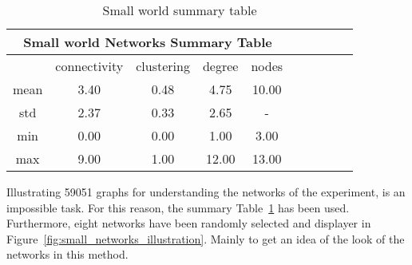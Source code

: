 \begin{table}[!hbtp]
	\centering
	\begin{adjustbox}{width=0.5\textwidth}
		\small
		\begin{tabular}{cccccccccc}
				\toprule
			\multicolumn{5}{|c|}{Small world Networks Summary Table}           \\ \hline
			     & connectivity & clustering & degree & nodes                  \\ \hline
			mean & 3.40         & 0.48       & 4.75   & 10.00                  \\ \hline
			std  & 2.37         & 0.33       & 2.65   & \multicolumn{1}{c}{-} \\ \hline
			min  & 0.00         & 0.00       & 1.00   & 3.00                   \\ \hline
			max  & 9.00         & 1.00       & 12.00  & 13.00                   \\ \bottomrule
		\end{tabular}
	\end{adjustbox}
	\caption{Small world summary table}
	\label{table:small-world-summary-table}
\end{table}

Illustrating 59051 graphs for understanding the networks of the experiment, is
an impossible task. For this reason, the summary Table~\ref{table:small-world-summary-table}
has been used. Furthermore, eight networks have been randomly selected and
displayer in Figure~\ref{fig:small_networks_illustration}. Mainly to get an idea
of the look of the networks in this method.

